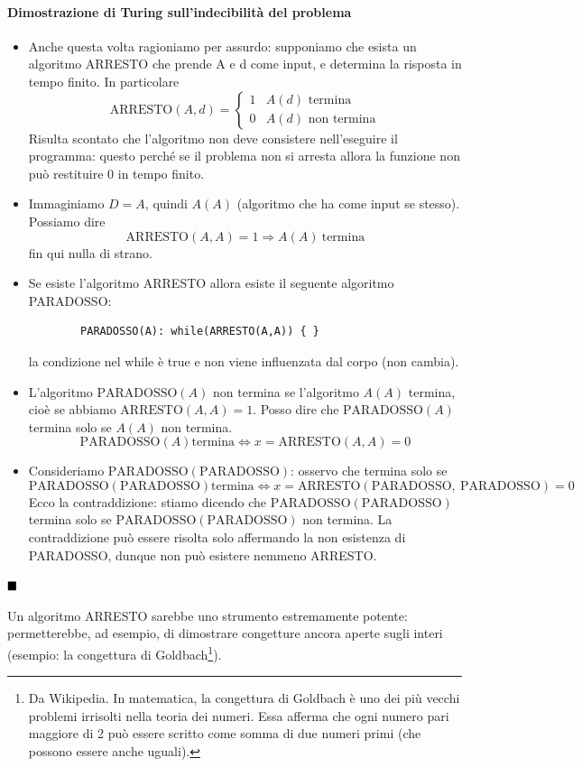 \paragraph{Dimostrazione di Turing sull'indecibilità del problema}
\begin{itemize} 
	\item Anche questa volta ragioniamo per assurdo: supponiamo che esista un algoritmo ARRESTO che prende A e d come input, e determina la risposta in tempo finito. In particolare
	\[\text{ARRESTO}(A,d)=\begin{cases}1&A(d)\text{ termina}\\0&A(d)\text{ non termina}\end{cases}\]
	Risulta scontato che l’algoritmo non deve consistere nell’eseguire il programma: questo perché se il problema non si arresta allora la funzione non può restituire 0 in tempo finito.
	\item Immaginiamo $D=A$, quindi $A(A)$ (algoritmo che ha come input se stesso). Possiamo dire
	\[\text{ARRESTO}\left(A,A\right)=1\Longrightarrow A\left(A\right)\mathrm{\ termina}\]
	fin qui nulla di strano.
	\item Se esiste l’algoritmo ARRESTO allora esiste il seguente algoritmo PARADOSSO:
	\begin{verbatim}
		PARADOSSO(A): while(ARRESTO(A,A)) { }
	\end{verbatim}
	la condizione nel while è true e non viene influenzata dal corpo (non cambia).
	\item L'algoritmo $\text{PARADOSSO}(A)$ non termina se l'algoritmo $A(A)$ termina, cioè se abbiamo $\text{ARRESTO}\left(A,A\right)=1$. Posso dire che $\text{PARADOSSO}(A)$ termina solo se $A(A)$ non termina.
	\[\text{PARADOSSO}\left(A\right)\mathrm{ termina}\Longleftrightarrow x=\text{ARRESTO}\left(A,A\right)=0\]
	\item Consideriamo $\text{PARADOSSO}(\text{PARADOSSO})$: osservo che termina solo se 
	\[\text{PARADOSSO}\left(\text{PARADOSSO}\right)\mathrm{termina}\Longleftrightarrow x=\text{ARRESTO}\left(\text{PARADOSSO},\ \text{PARADOSSO}\right)=0\]
	Ecco la contraddizione: stiamo dicendo che $\text{PARADOSSO}\left(\text{PARADOSSO}\right)$ termina solo se $\text{PARADOSSO}\left(\text{PARADOSSO}\right)$ non termina. La contraddizione può essere risolta solo affermando la non esistenza di PARADOSSO, dunque non può esistere nemmeno ARRESTO.
\end{itemize}
$\hfill\blacksquare$

\noindent Un algoritmo ARRESTO sarebbe uno strumento estremamente potente: permetterebbe, ad esempio, di dimostrare congetture ancora aperte sugli interi (esempio: la congettura di Goldbach\footnote{Da Wikipedia. In matematica, la congettura di Goldbach è uno dei più vecchi problemi irrisolti nella teoria dei numeri. Essa afferma che ogni numero pari maggiore di 2 può essere scritto come somma di due numeri primi (che possono essere anche uguali).}).


